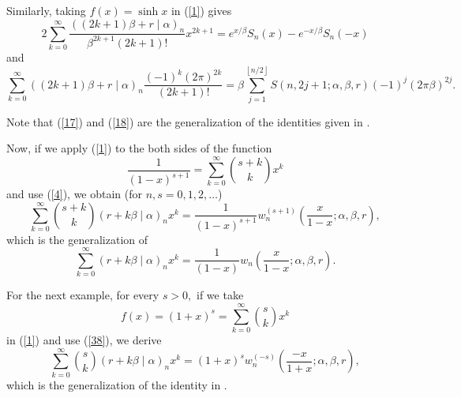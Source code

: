\documentclass{article}%
\begin{document}
Similarly, taking $f\left(  x\right)  =\sinh x$ in (\ref{1}) gives%
\[
2\sum_{k=0}^{\infty}\frac{\left(  \left(  2k+1\right)  \beta+r\mid
\alpha\right)  _{n}}{\beta^{2k+1}\left(  2k+1\right)  !}x^{2k+1}=e^{x/\beta
}S_{n}\left(  x\right)  -e^{-x/\beta}S_{n}\left(  -x\right)
\]
and%
\begin{equation}
\sum_{k=0}^{\infty}\left(  \left(  2k+1\right)  \beta+r\mid\alpha\right)
_{n}\frac{\left(  -1\right)  ^{k}\left(  2\pi\right)  ^{2k}}{\left(
2k+1\right)  !}=\beta\sum_{j=1}^{\left\lfloor n/2\right\rfloor }S\left(
n,2j+1;\alpha,\beta,r\right)  \left(  -1\right)  ^{j}\left(  2\pi\beta\right)
^{2j}. \label{18}%
\end{equation}


Note that (\ref{17}) and (\ref{18}) are the generalization of the identities
given in \cite[Page 403]{MezoandRamirez}.

Now, if we apply (\ref{1}) to the both sides of the function%
\[
\frac{1}{\left(  1-x\right)  ^{s+1}}=\sum_{k=0}^{\infty}\binom{s+k}{k}x^{k}%
\]
and use (\ref{4}), we obtain (for $n,s=0,1,2,\ldots$)%
\begin{equation}
\sum_{k=0}^{\infty}\binom{s+k}{k}\left(  r+k\beta\mid\alpha\right)  _{n}%
x^{k}=\frac{1}{\left(  1-x\right)  ^{s+1}}w_{n}^{\left(  s+1\right)  }\left(
\frac{x}{1-x};\alpha,\beta,r\right)  , \label{5}%
\end{equation}
which is the generalization of \cite{Kargin}%
\begin{equation}
\sum_{k=0}^{\infty}\left(  r+k\beta\mid\alpha\right)  _{n}x^{k}=\frac
{1}{\left(  1-x\right)  }w_{n}\left(  \frac{x}{1-x};\alpha,\beta,r\right)  .
\label{21}%
\end{equation}


For the next example, for every $s>0,$ if we take
\[
f\left(  x\right)  =\left(  1+x\right)  ^{s}=\sum_{k=0}^{\infty}\binom{s}%
{k}x^{k}%
\]
in (\ref{1}) and use (\ref{38}), we derive%
\[
\sum_{k=0}^{\infty}\binom{s}{k}\left(  r+k\beta\mid\alpha\right)  _{n}%
x^{k}=\left(  1+x\right)  ^{s}w_{n}^{\left(  -s\right)  }\left(  \frac
{-x}{1+x};\alpha,\beta,r\right)  ,
\]
which is the generalization of the identity in \cite[Eq. 9]{BandDil}.
\end{document}

